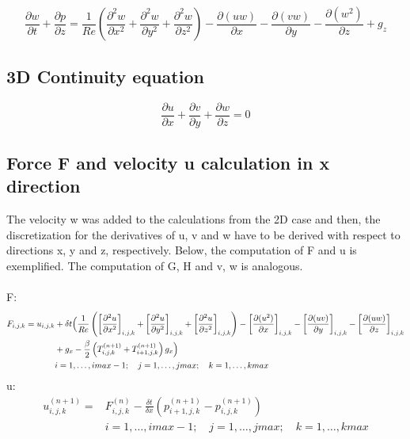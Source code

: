 \documentclass{article}%
\begin{document}
\begin{equation}
\frac{\partial w}{\partial t} + \frac{\partial p}{\partial z} = 
\frac{1}{Re} \left( \frac{\partial^2 w}{\partial x^2} + \frac{\partial^2 w}{\partial y^2} + \frac{\partial^2 w}{\partial z^2} \right) - 
\frac{\partial(uw)}{\partial x} -\frac{\partial (vw)}{\partial y} - 
\frac{\partial (w^2)}{\partial z} +
g_z
\end{equation}

\subsection{3D Continuity equation}
\begin{equation}
\frac{\partial u}{\partial x} + \frac{\partial v}{\partial y} + \frac{\partial w}{\partial z} = 0
\end{equation}

\subsection{Force F and velocity u calculation in x direction}
The velocity w was added to the calculations from the 2D case and then, the discretization for the derivatives of u, v and w have to be derived with respect to directions x, y and z, respectively. Below, the computation of F and u is exemplified. The computation of G, H and v, w is analogous. \\
\\
F:
\begin{equation}
\begin{split}
F_{i,j,k} =
u_{i,j,k} & + \delta t \Bigl(
\frac{1}{Re} \left( \left[\frac{\partial^2 u}{\partial x^2}\right]_{i,j,k} + \left[\frac{\partial^2 u}{\partial y^2}\right]_{i,j,k} + \left[\frac{\partial^2 u}{\partial z^2}\right]_{i,j,k} \right) - 
\left[\frac{\partial(u^2)}{\partial x}\right]_{i,j,k} -\left[\frac{\partial (uv)}{\partial y}\right]_{i,j,k} - 
\left[\frac{\partial (uw)}{\partial z}\right]_{i,j,k}\\
& + {g_x} - \frac{\beta}{2} \left( T^{(n+1)}_{i,j,k} + T^{(n+1)}_{i+1,j,k} \right) g_x \Bigr)\\
& i = 1,\ldots,imax-1; \quad j = 1,\ldots,jmax; \quad k = 1,\ldots,kmax
\end{split}
\end{equation}
u:\\
\begin{equation}
\begin{split}
u^{(n+1)}_{i,j,k} = & F^{(n)}_{i,j,k} - \frac{\delta t}{\delta x}\left(p^{(n+1)}_{i+1,j,k} - p^{(n+1)}_{i,j,k}\right)\\
& i = 1,\ldots,imax-1; \quad j = 1,\ldots,jmax; \quad k = 1,\ldots,kmax
\end{split}
\end{equation}
\end{document}

